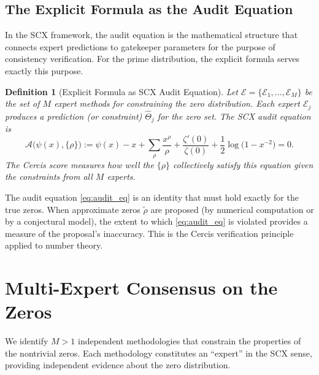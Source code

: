 \documentclass[12pt,a4paper]{article}
\newtheorem{definition}[theorem]{Definition}
\theoremstyle{remark}
\newcommand{\A}{\mathcal{A}}
\newcommand{\ExpertSet}{\mathcal{E}}
\begin{document}
\subsection{The Explicit Formula as the Audit Equation}
\label{sec:audit_eq}
In the SCX framework, the audit equation is the mathematical structure that
connects expert predictions to gatekeeper parameters for the purpose of
consistency verification. For the prime distribution, the explicit formula
serves exactly this purpose.
\begin{definition}[Explicit Formula as SCX Audit Equation]
\label{def:audit_eq}
Let $\ExpertSet = \{\mathcal{E}_1, \ldots, \mathcal{E}_M\}$ be the set of
$M$ expert methods for constraining the zero distribution. Each expert
$\mathcal{E}_j$ produces a prediction (or constraint) $\hat{\Theta}_j$ for
the zero set. The SCX audit equation is
\begin{equation}
\label{eq:audit_eq}
\A\bigl(\psi(x), \{\rho\}\bigr) :=
\psi(x) - x + \sum_{\rho} \frac{x^{\rho}}{\rho}
+ \frac{\zeta'(0)}{\zeta(0)} + \frac12 \log\!\bigl(1 - x^{-2}\bigr) = 0.
\end{equation}
The Cercis score measures how well the $\{\rho\}$ collectively satisfy
this equation given the constraints from all $M$ experts.
\end{definition}
The audit equation \eqref{eq:audit_eq} is an identity that must hold exactly
for the true zeros. When approximate zeros $\tilde{\rho}$ are proposed
(by numerical computation or by a conjectural model), the extent to which
\eqref{eq:audit_eq} is violated provides a measure of the proposal's
inaccuracy. This is the Cercis verification principle applied to number
theory.
\section{Multi-Expert Consensus on the Zeros}
\label{sec:multiexpert}
We identify $M > 1$ independent methodologies that constrain the properties
of the nontrivial zeros. Each methodology constitutes an ``expert'' in the
SCX sense, providing independent evidence about the zero distribution.
\end{document}
